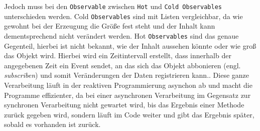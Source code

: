 Jedoch muss bei den \texttt{Observable} zwischen \texttt{Hot} und  \texttt{Cold Observables} unterschieden werden.
Cold \texttt{Observables} sind mit Listen vergleichbar, da wie gewohnt bei der Erzeugung die Gr\"o\ss{}e fest steht und der Inhalt kann dementsprechend nicht ver\"andert werden.
Hot \texttt{Observables} sind das genaue Gegenteil, hierbei ist nicht bekannt, wie der Inhalt aussehen k\"onnte oder wie gro\ss{} das Objekt wird. Hierbei wird ein Zeitintervall erstellt, dass innerhalb der angegebenen Zeit ein Event sendet, an das sich das Objekt abbonieren (engl. \textit{subscriben}) und somit Ver\"anderungen der Daten registrieren kann.\cite{Lohmuller2016}. Diese ganze Verarbeitung l\"auft in der reaktiven Programmierung asynchon ab und macht die Programme effizienter, da bei einer asynchronen Verarbeitung im Gegensatz zur synchronen Verarbeitung nicht gewartet wird, bis das Ergebnis einer Methode zur\"uck gegeben wird, sondern l\"auft im Code weiter und gibt das Ergebnis sp\"ater, sobald es vorhanden ist zur\"uck.

